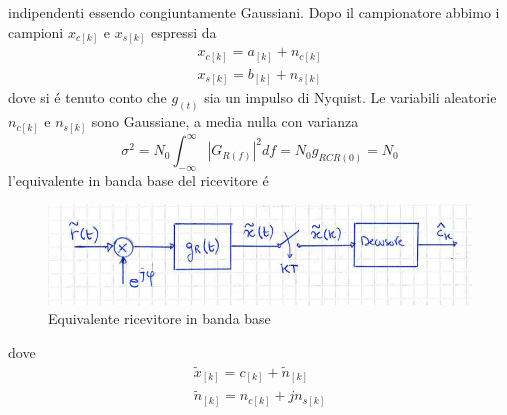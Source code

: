             indipendenti essendo congiuntamente Gaussiani. Dopo il campionatore abbimo i campioni $x_{c[k]}$ e $x_{s[k]}$ espressi da 
            \begin{gather}
                x_{c[k]} = a_[k]+n_{c[k]}\nonumber \\
                x_{s[k]} = b_[k]+n_{s[k]}\nonumber
            \end{gather}
            dove si é tenuto conto che $g_{(t)}$ sia un impulso di Nyquist. Le variabili aleatorie $n_{c[k]}$ e $n_{s[k]}$ sono 
            Gaussiane, a media nulla con varianza 
            \[
                \sigma^2 = N_0\int_{-\infty}^{\infty}\left|G_{R(f)}\right|^2df= N_0g_{RCR(0)} = N_0
            \]
            l'equivalente in banda base del ricevitore é 
            \begin{figure}[H]
                \centering
                \includegraphics[width = 12cm]{media/equivalente in banda base ricevitore qam.png}
                \caption{Equivalente ricevitore in banda base}
            \end{figure}
            dove
            \begin{gather}
                \tilde{x}_{[k]} = c_{[k]}+\tilde{n}_{[k]} \nonumber \\
                \tilde{n}_{[k]} = n_{c[k]}+jn_{s[k]} \nonumber 
            \end{gather}

